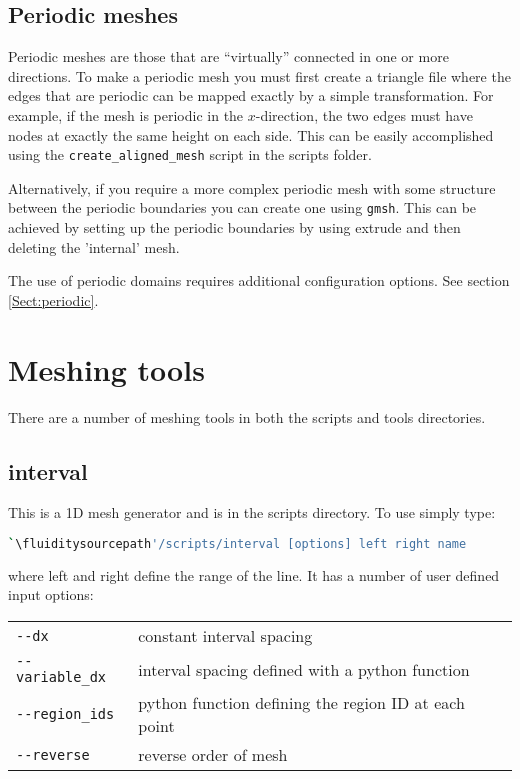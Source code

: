 \subsection{Periodic meshes}
\label{mesh!mesh types!periodic} 
Periodic meshes are those that are ``virtually'' connected in one or more directions. To make a periodic
mesh you must first create a triangle file where the edges that are periodic
can be mapped exactly by a simple transformation. For example, if the mesh
is periodic in the $x$-direction, the two edges must have nodes at exactly the
same height on each side. This can be easily accomplished using the
\lstinline[language=Bash]+create_aligned_mesh+ script in the scripts folder.

Alternatively, if you require a more complex periodic mesh with some structure between the periodic 
boundaries you can create one using \lstinline[language=Bash]{gmsh}. This can be achieved by 
setting up the periodic boundaries by using extrude and then deleting the 'internal' mesh.

The use of periodic domains requires additional configuration options. See
section \ref{Sect:periodic}.

\section{Meshing tools}

There are a number of meshing tools in both the scripts and tools directories.

\subsection{interval}
This is a 1D mesh generator and is in the scripts directory. To use simply type:


\begin{lstlisting}[language = Bash]
`\fluiditysourcepath'/scripts/interval [options] left right name 
\end{lstlisting}

where left and right define the range of the line. It has a number of user defined input options:


\begin{center}
  \begin{tabular}{lp{}}
    \hline
    \lstinline+--dx+ & constant interval spacing\\
    \lstinline+--variable_dx+ & interval spacing defined with a python function\\
    \lstinline+--region_ids+ & python function defining the region ID at each point\\
    \lstinline+--reverse+ & reverse order of mesh\\
    \hline
  \end{tabular}
\end{center}



